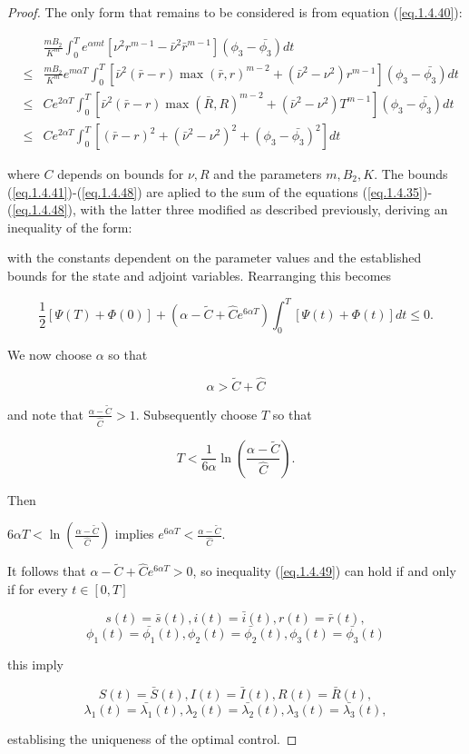 \begin{proof}
The only form that remains to be considered is from equation (\ref{eq.1.4.40}):

\begin{eqnarray}
&&\frac{mB_2}{K^m}\int_{0}^{T}e^{\alpha m 
t}[\nu^2r^{m-1}-\bar{\nu}^2\bar{r}^{m-1}](\phi_3-\bar{\phi_3})dt\nonumber\\ 
&\leq& \frac{mB_2}{K^m}e^{m\alpha 
T}\int_{0}^{T}[\bar{\nu}^2(\bar{r}-r)\max(\bar{r},r)^{m-2}+(\bar{\nu}^2-\nu^2)r^{m-1}](\phi_3-\bar{\phi_3})dt\nonumber\\
&\leq& Ce^{2\alpha 
T}\int_{0}^{T}[\bar{\nu}^2(\bar{r}-r)\max(\bar{R},R)^{m-2}+(\bar{\nu}^2-\nu^2)T^{m-1}](\phi_3-\bar{\phi_3})dt\nonumber\\
&\leq& Ce^{2\alpha 
T}\int_{0}^{T}[(\bar{r}-r)^2+(\bar{\nu}^2-\nu^2)^2+(\phi_3-\bar{\phi_3})^2]dt 
\label{eq.1.4.48}
\end{eqnarray}

where $C$ depends on bounds for $\nu,R$ and the parameters $m,B_2,K$. The 
bounds (\ref{eq.1.4.41})-(\ref{eq.1.4.48}) are aplied to the sum of the 
equations (\ref{eq.1.4.35})-(\ref{eq.1.4.48}), with the latter three modified 
as described previously, deriving an inequality of the form:



with the constants dependent on the parameter values and the established bounds 
for the state and adjoint variables. Rearranging this becomes

\begin{equation}\label{eq.1.4.49}
\frac{1}{2}[\Psi(T)+\Phi(0)]+(\alpha-\tilde{C}+\hat{C}e^{6\alpha 
T})\int_{0}^{T}[\Psi(t)+\Phi(t)]dt\leq 0.
\end{equation}

We now choose $\alpha$ so that 

$$\alpha>\tilde{C}+\hat{C}$$

and note that $\frac{\alpha-\tilde{C}}{\hat{C}}>1$. Subsequently choose $T$ so 
that 

$$T<\frac{1}{6\alpha}\ln\left(\frac{\alpha-\tilde{C}}{\hat{C}}\right).$$

Then

$6\alpha T<\ln\left(\frac{\alpha-\tilde{C}}{\hat{C}}\right)$ implies 
$e^{6\alpha T}<\frac{\alpha-\tilde{C}}{\hat{C}}$.

It follows that $\alpha-\tilde{C}+\hat{C}e^{6\alpha T}>0$, so inequality 
(\ref{eq.1.4.49}) can hold if and only if for every $t\in [0,T]$

$$s(t)=\bar{s}(t),i(t)=\bar{i}(t),r(t)=\bar{r}(t),$$
$$\phi_1(t)=\bar{\phi_1}(t),\phi_2(t)=\bar{\phi_2}(t),\phi_3(t)=\bar{\phi_3}(t)$$

this imply

$$S(t)=\bar{S}(t),I(t)=\bar{I}(t),R(t)=\bar{R}(t),$$
$$\lambda_1(t)=\bar{\lambda_1}(t),\lambda_2(t)=\bar{\lambda_2}(t),\lambda_3(t)=\bar{\lambda_3}(t),$$

establising the uniqueness of the optimal control.
\end{proof}

